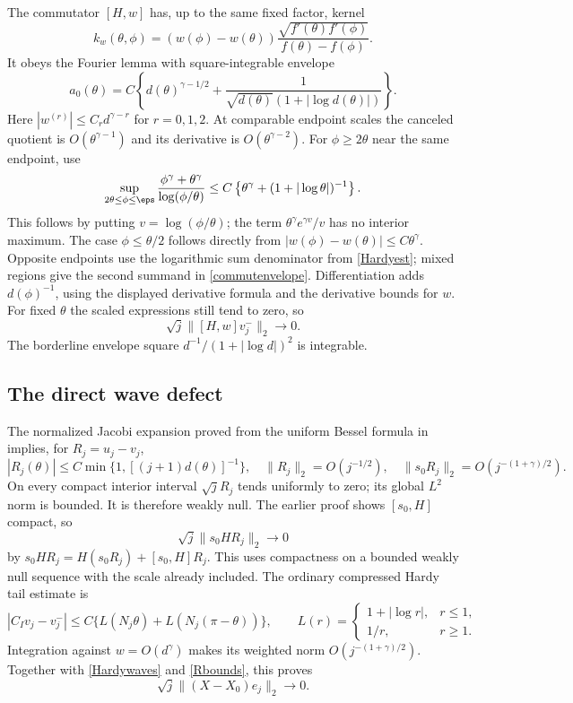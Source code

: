 The commutator $[H,w]$ has, up to the same fixed factor, kernel
\[
 k_w(\theta,\phi)=(w(\phi)-w(\theta))
       \frac{\sqrt{f'(\theta)f'(\phi)}}{f(\theta)-f(\phi)}.
\]
It obeys the Fourier lemma with square-integrable envelope
\begin{equation}\label{commutenvelope}
 a_0(\theta)=C\left\{d(\theta)^{\gamma-1/2}
       +\frac1{\sqrt{d(\theta)}(1+|\log d(\theta)|)}\right\}.
\end{equation}
Here $|w^{(r)}|\le C_rd^{\gamma-r}$ for $r=0,1,2$.
At comparable endpoint scales the canceled quotient is
$O(\theta^{\gamma-1})$ and its derivative is
$O(\theta^{\gamma-2})$. For $\phi\ge2\theta$ near the same
endpoint, use
\[
 \sup_{2\theta\le\phi\le\eps}
 \frac{\phi^\gamma+\theta^\gamma}{\log(\phi/\theta)}
 \le C\left\{\theta^\gamma+(1+|\log\theta|)^{-1}\right\}.
\]
This follows by putting $v=\log(\phi/\theta)$; the term
$\theta^\gamma e^{\gamma v}/v$ has no interior maximum.
The case $\phi\le\theta/2$ follows directly from
$|w(\phi)-w(\theta)|\le C\theta^\gamma$. Opposite endpoints use
the logarithmic sum denominator from \eqref{Hardyest}; mixed
regions give the second summand in \eqref{commutenvelope}.
Differentiation adds $d(\phi)^{-1}$, using the displayed derivative
formula and the derivative bounds for $w$. For fixed $\theta$ the
scaled expressions still tend to zero, so
\begin{equation}\label{commuterate}
 \sqrt j\|[H,w]v_j^-\|_2\to0.
\end{equation}
The borderline envelope square $d^{-1}/(1+|\log d|)^2$ is integrable.

\subsection{The direct wave defect}
The normalized Jacobi expansion proved from the uniform Bessel
formula in \cite[Section 9]{r124} implies, for $R_j=u_j-v_j$,
\begin{equation}\label{Rbounds}
 |R_j(\theta)|\le C\min\{1,[(j+1)d(\theta)]^{-1}\},\quad
 \|R_j\|_2=O(j^{-1/2}),\quad
 \|s_0R_j\|_2=O(j^{-(1+\gamma)/2}).
\end{equation}
On every compact interior interval $\sqrt jR_j$ tends uniformly
to zero; its global $L^2$ norm is bounded. It is therefore weakly
null. The earlier proof shows $[s_0,H]$ compact, so
\[
 \sqrt j\|s_0HR_j\|_2\to0
\]
by $s_0HR_j=H(s_0R_j)+[s_0,H]R_j$.
This uses compactness on a bounded weakly null sequence with the
scale already included.
The ordinary compressed Hardy tail estimate is
\[
 |C_Iv_j-v_j^-|\le C\{L(N_j\theta)+L(N_j(\pi-\theta))\},\qquad
 L(r)=\begin{cases}1+|\log r|,&r\le1,\\1/r,&r\ge1.\end{cases}
\]
Integration against $w=O(d^\gamma)$ makes its weighted norm
$O(j^{-(1+\gamma)/2})$. Together with \eqref{Hardywaves} and
\eqref{Rbounds}, this proves
\begin{equation}\label{directdefect}
 \sqrt j\|(X-X_0)e_j\|_2\to0.
\end{equation}


